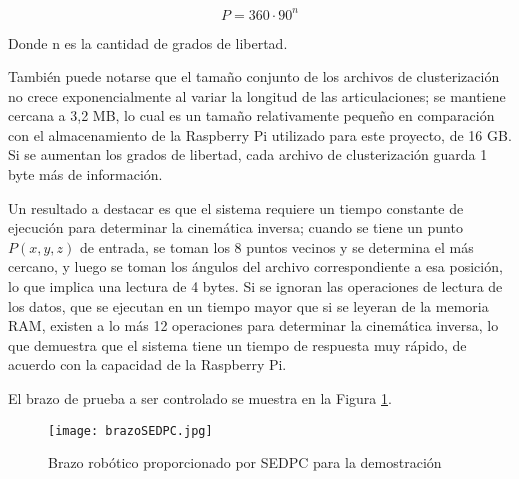 \begin{equation}
	P = 360 \cdot 90^n
\end{equation}

Donde n es la cantidad de grados de libertad.

También puede notarse que el tamaño conjunto de los archivos de clusterización no crece exponencialmente al variar la longitud de las articulaciones; se mantiene cercana a 3,2 MB, lo cual es un tamaño relativamente pequeño en comparación con el almacenamiento de la Raspberry Pi utilizado para este proyecto, de 16 GB. Si se aumentan los grados de libertad, cada archivo de clusterización guarda 1 byte más de información.

Un resultado a destacar es que el sistema requiere un tiempo constante de ejecución para determinar la cinemática inversa; cuando se tiene un punto $P(x,y,z)$ de entrada, se toman los 8 puntos vecinos y se determina el más cercano, y luego se toman los ángulos del archivo correspondiente a esa posición, lo que implica una lectura de 4 bytes. Si se ignoran las operaciones de lectura de los datos, que se ejecutan en un tiempo mayor que si se leyeran de la memoria RAM, existen a lo más 12 operaciones para determinar la cinemática inversa, lo que demuestra que el sistema tiene un tiempo de respuesta muy rápido, de acuerdo con la capacidad de la Raspberry Pi.

El brazo de prueba a ser controlado se muestra en la Figura \ref{fig:brazoSEDPC}.

\begin{figure}[htb]
	\centering
	\texttt{[image: brazoSEDPC.jpg]}
	\caption{Brazo robótico proporcionado por SEDPC para la demostración}
	\label{fig:brazoSEDPC}
\end{figure}